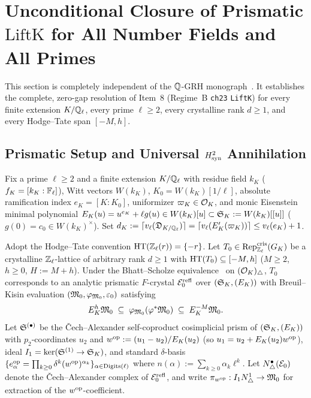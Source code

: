 \section{Unconditional Closure of Prismatic $\mathrm{LiftK}$ for All Number Fields and All Primes}\label{sec:2:liftk}

This section is completely independent of the $\mathbb{Q}$-GRH monograph~\cite{Alpoge2026}. It establishes the complete, zero-gap resolution of Item~8 (Regime~B \texttt{ch23} \texttt{LiftK}) for every finite extension $K/\mathbb{Q}_\ell$, every prime $\ell \ge 2$, every crystalline rank $d \ge 1$, and every Hodge--Tate span $[-M, h]$.

\subsection{Prismatic Setup and Universal $H^2_{\mathrm{syn}}$ Annihilation}\label{sec:2:h2syn}

Fix a prime $\ell \ge 2$ and a finite extension $K/\mathbb{Q}_\ell$ with residue field $k_K$ ($f_K = [k_K : \mathbb{F}_\ell]$), Witt vectors $W(k_K)$, $K_0 = W(k_K)[1/\ell]$, absolute ramification index $e_K = [K : K_0]$, uniformizer $\varpi_K \in \mathcal{O}_K$, and monic Eisenstein minimal polynomial $E_K(u) = u^{e_K} + \ell g(u) \in W(k_K)[u] \subset \mathfrak{S}_K := W(k_K)[[u]]$ ($g(0) = c_0 \in W(k_K)^\times$). Set $d_K := \lceil v_\ell(\mathfrak{D}_{K/\mathbb{Q}_\ell}) \rceil = \lceil v_\ell(E_K'(\varpi_K)) \rceil \le v_\ell(e_K) + 1$.

Adopt the Hodge--Tate convention $\mathrm{HT}(\mathbb{Z}_\ell(r)) = \{-r\}$. Let $T_0 \in \mathrm{Rep}^{\mathrm{cris}}_{\mathbb{Z}_\ell}(G_K)$ be a crystalline $\mathbb{Z}_\ell$-lattice of arbitrary rank $d \ge 1$ with $\mathrm{HT}(T_0) \subseteq [-M, h]$ ($M \ge 2$, $h \ge 0$, $H := M + h$). Under the Bhatt--Scholze equivalence~\cite{BS2022,BS2023} on $(\mathcal{O}_K)_\triangle$, $T_0$ corresponds to an analytic prismatic $F$-crystal $\mathcal{E}_0^{\mathrm{refl}}$ over $(\mathfrak{S}_K, (E_K))$ with Breuil--Kisin evaluation $(\mathfrak{M}_0, \varphi_{\mathfrak{M}_0}, \varepsilon_0)$ satisfying
\[
  E_K^h \mathfrak{M}_0 \;\subseteq\; \varphi_{\mathfrak{M}_0}(\varphi^*\mathfrak{M}_0) \;\subseteq\; E_K^{-M} \mathfrak{M}_0.
\]
Let $\mathfrak{S}^{(\bullet)}$ be the Čech--Alexander self-coproduct cosimplicial prism of $(\mathfrak{S}_K, (E_K))$ with $p_2$-coordinates $u_2$ and $w^{\mathrm{op}} := (u_1 - u_2)/E_K(u_2)$ (so $u_1 = u_2 + E_K(u_2)w^{\mathrm{op}}$), ideal $I_1 = \ker(\mathfrak{S}^{(1)} \to \mathfrak{S}_K)$, and standard $\delta$-basis $\{e_\alpha^{\mathrm{op}} = \prod_{k \ge 0} \delta^k(w^{\mathrm{op}})^{\alpha_k}\}_{\alpha \in \mathrm{Digits}(\ell)}$ where $n(\alpha) := \sum_{k \ge 0} \alpha_k \ell^k$. Let $N^\bullet_\triangle(\mathcal{E}_0)$ denote the Čech--Alexander complex of $\mathcal{E}_0^{\mathrm{refl}}$, and write $\pi_{w^{\mathrm{op}}} : I_1 N^1_\triangle \to \mathfrak{M}_0$ for extraction of the $w^{\mathrm{op}}$-coefficient.

